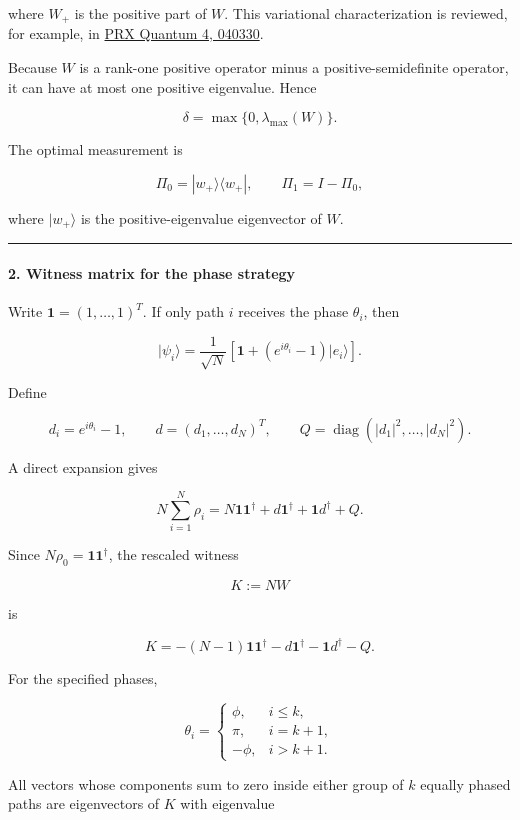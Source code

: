 where $W_+$ is the positive part of $W$. This variational characterization is reviewed, for example, in \href{\detokenize{https://journals.aps.org/prxquantum/pdf/10.1103/PRXQuantum.4.040330}}{PRX Quantum 4, 040330}.

Because $W$ is a rank-one positive operator minus a positive-semidefinite operator, it can have at most one positive eigenvalue. Hence

\[
{\delta=\max\{0,\lambda_{\max}(W)\}}.
\]

The optimal measurement is

\[
\Pi_0=|w_+\rangle\langle w_+|, \qquad \Pi_1=I-\Pi_0,
\]

where $|w_+\rangle$ is the positive-eigenvalue eigenvector of $W$.

\medskip\hrule\medskip

\paragraph*{2. Witness matrix for the phase strategy}

Write $\mathbf 1=(1,\ldots,1)^T$. If only path $i$ receives the phase $\theta_i$, then

\[
|\psi_i\rangle =\frac{1}{\sqrt N} \left[\mathbf 1+\left(e^{i\theta_i}-1\right)|e_i\rangle\right].
\]

Define

\[
d_i=e^{i\theta_i}-1, \qquad d=(d_1,\ldots,d_N)^T, \qquad Q=\operatorname{diag}(|d_1|^2,\ldots,|d_N|^2).
\]

A direct expansion gives

\[
N\sum_{i=1}^N\rho_i =N\mathbf 1\mathbf 1^\dagger +d\mathbf 1^\dagger+\mathbf 1d^\dagger+Q.
\]

Since $N\rho_0=\mathbf 1\mathbf 1^\dagger$, the rescaled witness

\[
K:=NW
\]

is

\[
K=-(N-1)\mathbf 1\mathbf 1^\dagger -d\mathbf 1^\dagger-\mathbf 1d^\dagger-Q.
\]

For the specified phases,

\[
\theta_i=
\begin{cases}
\phi,&i\leq k,\\
\pi,&i=k+1,\\
-\phi,&i>k+1.
\end{cases}
\]

All vectors whose components sum to zero inside either group of $k$ equally phased paths are eigenvectors of $K$ with eigenvalue

